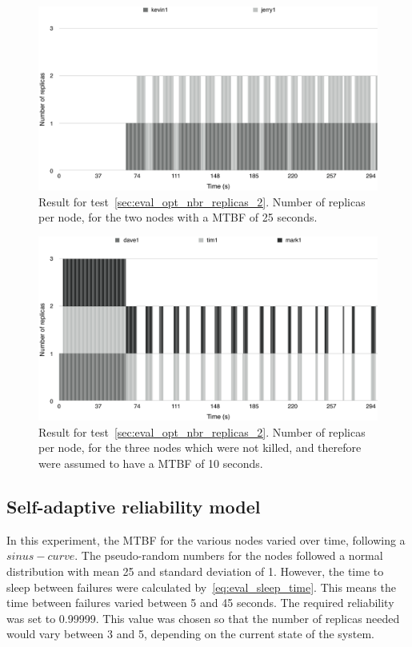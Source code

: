 \documentclass{cslthse-msc}
\begin{document}
\begin{figure}[!hbt]
\centering
\includegraphics[scale=0.5]{images/results/optimal_replicas/2/MTBF_25.pdf}
\caption{Result for test~\ref{sec:eval_opt_nbr_replicas_2}. Number of replicas per node, for the two nodes with a MTBF of 25 seconds.} \label{fig:exp_opt_replicas_MTBF_25_2}
\end{figure}

\begin{figure}[!hbt]
\centering
\includegraphics[scale=0.5]{images/results/optimal_replicas/2/MTBF_10.pdf}
\caption{Result for test~\ref{sec:eval_opt_nbr_replicas_2}. Number of replicas per node, for the three nodes which were not killed, and therefore were assumed to have a MTBF of 10 seconds.} \label{fig:exp_opt_replicas_MTBF_10_2}
\end{figure}


\subsection{Self-adaptive reliability model} \label{sec:eval_adaptive_rel_model}
In this experiment, the MTBF for the various nodes varied over time, following a $sinus-curve$. The pseudo-random numbers for the nodes followed a normal distribution with mean 25 and standard deviation of 1. However, the time to sleep between failures were calculated by~\ref{eq:eval_sleep_time}. This means the time between failures varied between 5 and 45 seconds. The required reliability was set to 0.99999. This value was chosen so that the number of replicas needed would vary between 3 and 5, depending on the current state of the system.
\end{document}
